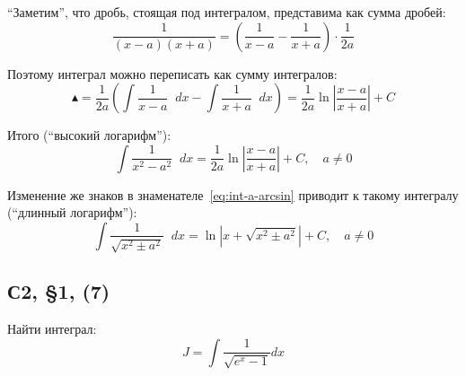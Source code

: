 \documentclass[a4paper,12pt]{article}
\newcommand{\diff}{\mathop{}\!d\!}
\begin{document}
  ``Заметим'', что дробь, стоящая под интегралом, представима как сумма дробей:
  \[
    \frac{1}{(x - a) (x + a)} = \left(\frac{1}{x - a} - \frac{1}{x + a}\right) \cdot \frac{1}{2a}
  \]
  
  Поэтому интеграл можно переписать как сумму интегралов:
  \[
    \blacktriangle = \frac{1}{2a} \left(\int \frac{1}{x - a} \diff x - \int \frac{1}{x + a} \diff x\right)
      = \frac{1}{2a} \ln \left| \frac{x - a}{x + a} \right| + C
  \]
  
  Итого (``высокий логарифм''):  
  \begin{equation}
    \int \frac{1}{x^2 - a^2} \diff x = \frac{1}{2a} \ln \left| \frac{x - a}{x + a} \right| + C,\quad a \not= 0
  \end{equation}
  
  Изменение же знаков в знаменателе~\eqref{eq:int-a-arcsin} приводит к такому интегралу (``длинный логарифм''):
  \begin{equation}
    \int \frac{1}{\sqrt{x^2 \pm a^2}} \diff x = \ln \left|x + \sqrt{x^2 \pm a^2}\right| + C,\quad a \not= 0
  \end{equation}
  
  
  \subsection{С2, \S 1, (7)}
  
  Найти интеграл:
  \[
    J = \int \frac{1}{\sqrt{e^x - 1}} dx
  \]
  
\end{document}
